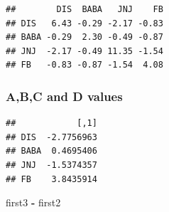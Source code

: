\documentclass[]{article}
\newenvironment{Shaded}{\begin{snugshade}}{\end{snugshade}}
\newcommand{\KeywordTok}[1]{\textcolor[rgb]{0.13,0.29,0.53}{\textbf{#1}}}
\newcommand{\DecValTok}[1]{\textcolor[rgb]{0.00,0.00,0.81}{#1}}
\newcommand{\StringTok}[1]{\textcolor[rgb]{0.31,0.60,0.02}{#1}}
\newcommand{\OperatorTok}[1]{\textcolor[rgb]{0.81,0.36,0.00}{\textbf{#1}}}
\newcommand{\NormalTok}[1]{#1}
\begin{document}
\begin{verbatim}
##        DIS  BABA   JNJ    FB
## DIS   6.43 -0.29 -2.17 -0.83
## BABA -0.29  2.30 -0.49 -0.87
## JNJ  -2.17 -0.49 11.35 -1.54
## FB   -0.83 -0.87 -1.54  4.08
\end{verbatim}

\subsubsection{A,B,C and D values}\label{abc-and-d-values}

\begin{Shaded}
\end{Shaded}

\begin{verbatim}
##            [,1]
## DIS  -2.7756963
## BABA  0.4695406
## JNJ  -1.5374357
## FB    3.8435914
\end{verbatim}

\begin{Shaded}
\begin{Highlighting}[]
\NormalTok{first3 }\OperatorTok{-}\StringTok{ }\NormalTok{first2}
\end{Highlighting}
\end{Shaded}
\end{document}
